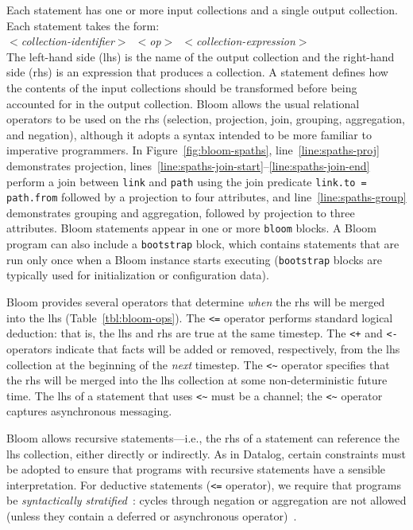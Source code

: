 Each statement has one or more input collections and a single output
collection.  Each statement takes the form: \\ \noindent
\mbox{\hspace{0.25in}\emph{$<$collection-identifier$>$ $<$op$>$
    $<$collection-expression$>$}}\\ \noindent
The left-hand side (lhs) is the name of the output collection and the right-hand
side (rhs) is an expression that produces a collection.  A statement defines how
the contents of the input collections should be transformed before being
accounted for in the output collection. Bloom allows the usual relational
operators to be used on the rhs (selection, projection, join, grouping,
aggregation, and negation), although it adopts a syntax intended to be more
familiar to imperative programmers. In Figure~\ref{fig:bloom-spaths},
line~\ref{line:spaths-proj} demonstrates projection,
lines~\ref{line:spaths-join-start}--\ref{line:spaths-join-end} perform a join
between \texttt{link} and \texttt{path} using the join predicate
\verb+link.to = path.from+ followed by a projection to four attributes, and
line~\ref{line:spaths-group} demonstrates grouping and aggregation, followed by
projection to three attributes. Bloom statements appear in one or more
\texttt{bloom} blocks. A Bloom program can also include a \texttt{bootstrap}
block, which contains statements that are run only once when a Bloom instance
starts executing (\texttt{bootstrap} blocks are typically used for
initialization or configuration data).

Bloom provides several operators that determine \emph{when} the rhs will be
merged into the lhs (Table~\ref{tbl:bloom-ops}). The \verb|<=| operator performs
standard logical deduction: that is, the lhs and rhs are true at the same
timestep. The \verb|<+| and \verb|<-| operators indicate that facts will be
added or removed, respectively, from the lhs collection at the beginning of the
{\em next} timestep. The \verb+<~+ operator specifies that the rhs will be merged into
the lhs collection at some non-deterministic future time. The lhs of a statement
that uses \verb+<~+ must be a channel; the \verb+<~+ operator captures
asynchronous messaging.

Bloom allows recursive statements---i.e., the rhs of a statement can reference
the lhs collection, either directly or indirectly. As in Datalog, certain
constraints must be adopted to ensure that programs with recursive statements
have a sensible interpretation. For deductive statements (\verb+<=+ operator),
we require that programs be \emph{syntactically stratified}~\cite{Apt1988}:
cycles through negation or aggregation are not allowed (unless they contain a deferred or asynchronous operator)~\cite{dedalus}.

